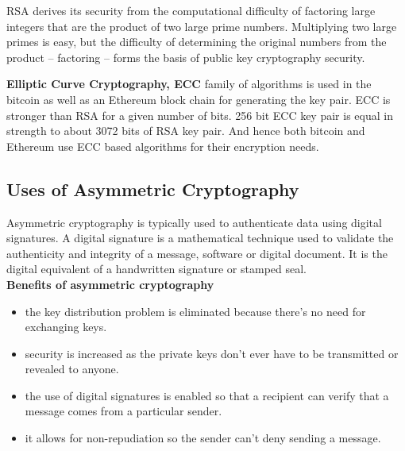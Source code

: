 \documentclass{article}
\begin{document}
RSA derives its security from the computational difficulty of factoring large integers that are the product of two large prime numbers. Multiplying two large primes is easy, but the difficulty of determining the original numbers from the product -- factoring -- forms the basis of public key cryptography security. \par
\textbf{Elliptic Curve Cryptography, ECC} family of algorithms is used in the bitcoin as well as an Ethereum block chain for generating the key pair. ECC is stronger than RSA for a given number of bits. 256 bit ECC key pair is equal in strength to about 3072 bits of RSA key pair. And hence both bitcoin and Ethereum use ECC based algorithms for their encryption needs.
\subsection{Uses of Asymmetric Cryptography}
Asymmetric cryptography is typically used to authenticate data using digital signatures. A digital signature is a mathematical technique used to validate the authenticity and integrity of a message, software or digital document. It is the digital equivalent of a handwritten signature or stamped seal. \\
\textbf{Benefits of asymmetric cryptography}
\begin{itemize}
    \item the key distribution problem is eliminated because there's no need for exchanging keys.
    \item security is increased as the private keys don't ever have to be transmitted or revealed to anyone.
    \item the use of digital signatures is enabled so that a recipient can verify that a message comes from a particular sender.
    \item it allows for non-repudiation so the sender can't deny sending a message.
\end{itemize}
\end{document}

